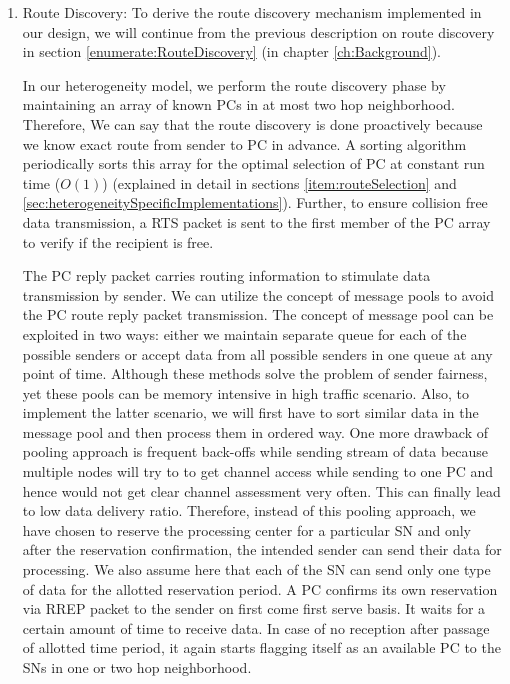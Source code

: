     \begin{enumerate}
        \item Route Discovery: To derive the route discovery mechanism implemented in our design, we will continue from the previous description on route discovery in section \ref{enumerate:RouteDiscovery} (in chapter \ref{ch:Background}). 
        
        \par
        In our heterogeneity model, we perform the route discovery phase by maintaining an array of known \acp{PC} in at most two hop neighborhood. Therefore, We can say that the route discovery is done proactively because we know exact route from sender to \ac{PC} in advance. A sorting algorithm periodically sorts this array for the optimal selection of \ac{PC} at constant run time ($O(1)$) (explained in detail in sections  \ref{item:routeSelection} and \ref{sec:heterogeneitySpecificImplementations}). Further, to ensure collision free data transmission, a \ac{RTS} packet is sent to the first member of the \ac{PC} array to verify if the recipient is free. 
        
        \par
        The \ac{PC} reply packet carries routing information to stimulate data transmission by sender. We can utilize the concept of message pools to avoid the \ac{PC} route reply packet transmission. The concept of message pool can be exploited in two ways: either we maintain separate queue for each of the possible senders or accept data from all possible senders in one queue at any point of time. Although these methods solve the problem of sender fairness, yet these pools can be memory intensive in high traffic scenario. Also, to implement the latter scenario, we will first have to sort similar data in the message pool and then process them in ordered way. One more drawback of pooling approach is frequent back-offs while sending stream of data because multiple nodes will try to to get channel access while sending to one \ac{PC} and hence would not get clear channel assessment very often. This can finally lead to low data delivery ratio. Therefore, instead of this pooling approach, we have chosen to reserve the processing center for a particular \ac{SN} and only after the reservation confirmation, the intended sender can send their data for processing. We also assume here that each of the \ac{SN} can send only one type of data for the allotted reservation period. A \ac{PC} confirms its own reservation via \ac{RREP} packet to the sender on first come first serve basis. It waits for a certain amount of time to receive data. In case of no reception after passage of allotted time period, it again starts flagging itself as an available \ac{PC} to the \acp{SN} in one or two hop neighborhood. 


\end{enumerate}
